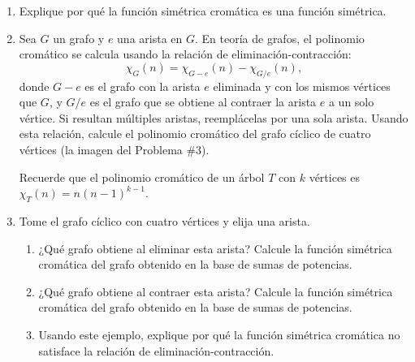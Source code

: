 \documentclass{article}
\begin{document}
\begin{enumerate}
\item Explique por qué la función simétrica cromática es una función simétrica.

\item Sea $G$ un grafo y $e$ una arista en $G$. En teoría de grafos, el polinomio cromático se calcula usando la relación de eliminación-contracción:
\[\chi_G(n) = \chi_{G-e}(n) -\chi_{G/e}(n), \] donde $G-e$ es el grafo con la arista $e$ eliminada y con los mismos vértices que $G$, y $G/e$ es el grafo que se obtiene al contraer la arista $e$ a un solo vértice. Si resultan múltiples aristas, reemplácelas por una sola arista.
Usando esta relación, calcule el polinomio cromático del grafo cíclico de cuatro vértices (la imagen del Problema \#3).

Recuerde que el polinomio cromático de un árbol $T$ con $k$ vértices es $\chi_T(n) = n(n-1)^{k-1}$.

\item Tome el grafo cíclico con cuatro vértices y elija una arista.
\begin{center}
\end{center}
\begin{enumerate}
    \item ¿Qué grafo obtiene al eliminar esta arista? Calcule la función simétrica cromática del grafo obtenido en la base de sumas de potencias.
    \item ¿Qué grafo obtiene al contraer esta arista? Calcule la función simétrica cromática del grafo obtenido en la base de sumas de potencias.
    \item Usando este ejemplo, explique por qué la función simétrica cromática no satisface la relación de eliminación-contracción.
\end{enumerate}


\end{enumerate}
\end{document}
